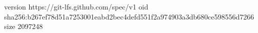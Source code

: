 version https://git-lfs.github.com/spec/v1
oid sha256:b267ef78d51a7253001eabd2bec4defd551f2a974903a3db680ce598556d7266
size 2097248
